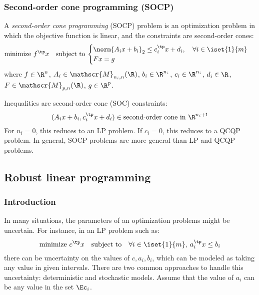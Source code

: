 \subsubsection{Second-order cone programming (SOCP)}
\begin{definition}
    A \emph{second-order cone programming} (SOCP) problem is an optimization problem in which the objective function is linear, and the constraints are second-order cones:
    \begin{equation*}
        \text{minimize } f^\tp x \quad\text{subject to}\: \begin{cases}
            \norm{A_i x + b_i}_2\leq c_i^\tp x + d_i, \quad\forall i\in\iset{1}{m}\\
            Fx=g
        \end{cases}
    \end{equation*}
    where $f\in\R^n$, $A_i\in\mathscr{M}_{n_i, n}(\R)$, $b_i\in\R^{n_i}$, $c_i\in\R^{n_i}$, $d_i\in\R$, $F\in\mathscr{M}_{p, n}(\R)$, $g\in\R^p$.

    Inequalities are second-order cone (SOC) constraints:
    \begin{equation*}
        (A_ix+b_i, c_i^\tp x+d_i)\in \text{second-order cone in } \R^{n_i+1}
    \end{equation*}
    For $n_i=0$, this reduces to an LP problem. If $c_i=0$, this reduces to a QCQP problem. In general, SOCP problems are more general than LP and QCQP problems.
\end{definition}

\subsection{Robust linear programming}
\subsubsection{Introduction}
In many situations, the parameters of an optimization problems might be uncertain. For instance, in an LP problem such as:
\begin{equation*}
    \text{minimize } c^\tp x \quad\text{subject to}\quad \forall i\in\iset{1}{m}, \: a_i^\tp x\leq b_i
\end{equation*}
there can be uncertainty on the values of $c, a_i, b_i$, which can be modeled as taking any value in given intervals. There are two common approaches to handle this uncertainty: deterministic and stochastic models. Assume that the value of $a_i$ can be any value in the set $\Ec_i$.

